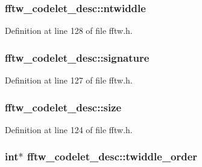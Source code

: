 \subsubsection[{\texorpdfstring{ntwiddle}{ntwiddle}}]{ fftw\+\_\+codelet\+\_\+desc\+::ntwiddle}\hypertarget{structfftw__codelet__desc_a2e68bbd836d4b760a1cd75c66409fd36}{}\label{structfftw__codelet__desc_a2e68bbd836d4b760a1cd75c66409fd36}


Definition at line 128 of file fftw.\+h.

\subsubsection[{\texorpdfstring{signature}{signature}}]{ fftw\+\_\+codelet\+\_\+desc\+::signature}\hypertarget{structfftw__codelet__desc_a8cf3f5020d8697ef1e29cc2d82be0dae}{}\label{structfftw__codelet__desc_a8cf3f5020d8697ef1e29cc2d82be0dae}


Definition at line 127 of file fftw.\+h.

\subsubsection[{\texorpdfstring{size}{size}}]{ fftw\+\_\+codelet\+\_\+desc\+::size}\hypertarget{structfftw__codelet__desc_a195e2487dcd74ffc44f888612d25ac94}{}\label{structfftw__codelet__desc_a195e2487dcd74ffc44f888612d25ac94}


Definition at line 124 of file fftw.\+h.

\subsubsection[{\texorpdfstring{twiddle\+\_\+order}{twiddle_order}}]{ {\bf int}$\ast$ fftw\+\_\+codelet\+\_\+desc\+::twiddle\+\_\+order}\hypertarget{structfftw__codelet__desc_a655dd809b3b9a6f6c0676879f08b05a1}{}\label{structfftw__codelet__desc_a655dd809b3b9a6f6c0676879f08b05a1}


